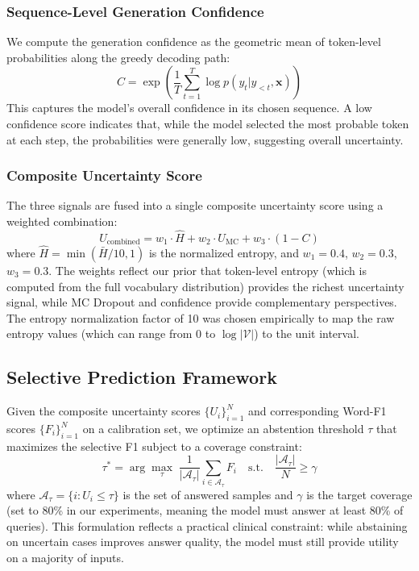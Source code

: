 \documentclass[pdflatex,sn-mathphys-num]{sn-jnl}
\begin{document}
\subsubsection{Sequence-Level Generation Confidence}

We compute the generation confidence as the geometric mean of token-level probabilities along the greedy decoding path:
\begin{equation}
    C = \exp\left(\frac{1}{T} \sum_{t=1}^{T} \log p(y_t|y_{<t}, \mathbf{x})\right)
\end{equation}
This captures the model's overall confidence in its chosen sequence. A low confidence score indicates that, while the model selected the most probable token at each step, the probabilities were generally low, suggesting overall uncertainty.

\subsubsection{Composite Uncertainty Score}

The three signals are fused into a single composite uncertainty score using a weighted combination:
\begin{equation}\label{eq:composite}
    U_{\text{combined}} = w_1 \cdot \hat{H} + w_2 \cdot U_{\text{MC}} + w_3 \cdot (1 - C)
\end{equation}
where $\hat{H} = \min(\bar{H}/10, 1)$ is the normalized entropy, and $w_1 = 0.4$, $w_2 = 0.3$, $w_3 = 0.3$. The weights reflect our prior that token-level entropy (which is computed from the full vocabulary distribution) provides the richest uncertainty signal, while MC Dropout and confidence provide complementary perspectives. The entropy normalization factor of 10 was chosen empirically to map the raw entropy values (which can range from 0 to $\log|\mathcal{V}|$) to the unit interval.

\subsection{Selective Prediction Framework}\label{subsec:abstention}

Given the composite uncertainty scores $\{U_i\}_{i=1}^{N}$ and corresponding Word-F1 scores $\{F_i\}_{i=1}^{N}$ on a calibration set, we optimize an abstention threshold $\tau$ that maximizes the selective F1 subject to a coverage constraint:
\begin{equation}
    \tau^* = \arg\max_{\tau} \; \frac{1}{|\mathcal{A}_\tau|} \sum_{i \in \mathcal{A}_\tau} F_i \quad \text{s.t.} \quad \frac{|\mathcal{A}_\tau|}{N} \geq \gamma
\end{equation}
where $\mathcal{A}_\tau = \{i : U_i \leq \tau\}$ is the set of answered samples and $\gamma$ is the target coverage (set to 80\% in our experiments, meaning the model must answer at least 80\% of queries). This formulation reflects a practical clinical constraint: while abstaining on uncertain cases improves answer quality, the model must still provide utility on a majority of inputs.
\end{document}

